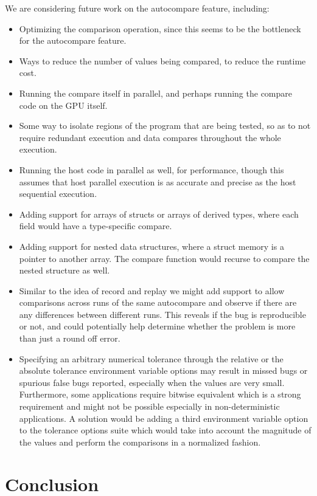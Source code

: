 We are considering future work on the autocompare feature, including:
\begin{itemize}
\item Optimizing the comparison operation, since this seems to be the bottleneck for the autocompare feature.
\item Ways to reduce the number of values being compared, to reduce the runtime cost.
\item Running the compare itself in parallel, and perhaps running the compare code on the GPU itself.
\item Some way to isolate regions of the program that are being tested, so as to not require redundant execution and data compares throughout the whole execution.
\item Running the host code in parallel as well, for performance, though this assumes that host parallel execution is as accurate and precise as the host sequential execution.
\item Adding support for arrays of structs or arrays of derived types, where each field would have a type-specific compare.
\item Adding support for nested data structures, where a struct memory is a pointer to another array.
The compare function would recurse to compare the nested structure as well.
\item Similar to the idea of record and replay \cite{sato2015clock} we might add support to allow comparisons across runs of the same autocompare and observe if there are any differences between different runs. This reveals if the bug is reproducible or not, and could potentially help determine whether the problem is more than just a round off error. 
\item Specifying an arbitrary numerical tolerance through the relative or the absolute tolerance environment variable options may result in missed bugs or spurious false bugs reported, especially when the values are very small. Furthermore, some applications require bitwise equivalent which is a strong requirement and might not be possible especially in non-deterministic applications. A solution would be adding a third environment variable option to the tolerance options suite which would take into account the magnitude of the values and perform the comparisons in a normalized fashion. 
\end{itemize}

\section{Conclusion}

